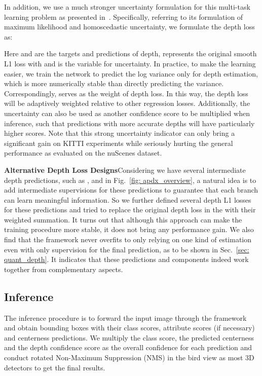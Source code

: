 In addition, we use a much stronger uncertainty formulation for this multi-task learning problem as presented in~\cite{MultiTask}. Specifically, referring to its formulation of maximum likelihood and homoscedastic uncertainty, we formulate the depth loss as:
\vspace{-1.0ex}

Here  and  are the targets and predictions of depth,  represents the original smooth L1 loss with  and  is the variable for uncertainty. In practice, to make the learning easier, we train the network to predict the log variance  only for depth estimation, which is more numerically stable than directly predicting the variance. Correspondingly,  serves as the weight of depth loss. In this way, the depth loss will be adaptively weighted relative to other regression losses. Additionally, the uncertainty  can also be used as another confidence score to be multiplied when inference, such that predictions with more accurate depths will have particularly higher scores. Note that this strong uncertainty indicator can only bring a significant gain on KITTI experiments while seriously hurting the general performance as evaluated on the nuScenes dataset.  

\noindent\textbf{Alternative Depth Loss Designs}\quad Considering we have several intermediate depth predictions, such as ,  and  in Fig.~\ref{fig: apdx_overview}, a natural idea is to add intermediate supervisions for these predictions to guarantee that each branch can learn meaningful information. So we further defined several depth L1 losses for these predictions and tried to replace the original depth loss in the  with their weighted summation. It turns out that although this approach can make the training procedure more stable, it does not bring any performance gain. We also find that the framework never overfits to only relying on one kind of estimation even with only supervision for the final prediction, as to be shown in Sec.~\ref{sec: quant_depth}. It indicates that these predictions and components indeed work together from complementary aspects. 

\subsection{Inference}
The inference procedure is to forward the input image through the framework and obtain bounding boxes with their class scores, attribute scores (if necessary) and centerness predictions. We multiply the class score, the predicted centerness and the depth confidence score as the overall confidence for each prediction and conduct rotated Non-Maximum Suppression (NMS) in the bird view as most 3D detectors to get the final results.

